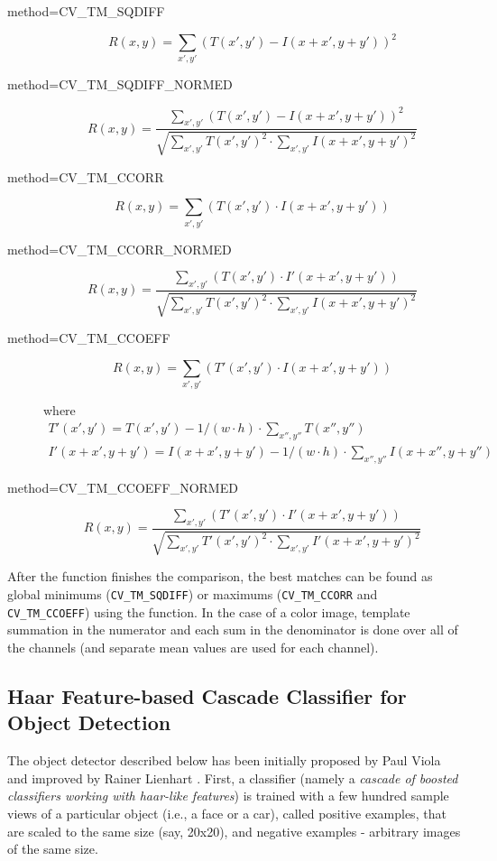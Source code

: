 \begin{description}
\item[method=CV\_TM\_SQDIFF]
\[ R(x,y)=\sum_{x',y'} (T(x',y')-I(x+x',y+y'))^2 \]

\item[method=CV\_TM\_SQDIFF\_NORMED]
\[ R(x,y)=\frac
{\sum_{x',y'} (T(x',y')-I(x+x',y+y'))^2}
{\sqrt{\sum_{x',y'}T(x',y')^2 \cdot \sum_{x',y'} I(x+x',y+y')^2}}
\]

\item[method=CV\_TM\_CCORR]
\[ R(x,y)=\sum_{x',y'} (T(x',y') \cdot I(x+x',y+y')) \]

\item[method=CV\_TM\_CCORR\_NORMED]
\[ R(x,y)=\frac
{\sum_{x',y'} (T(x',y') \cdot I'(x+x',y+y'))}
{\sqrt{\sum_{x',y'}T(x',y')^2 \cdot \sum_{x',y'} I(x+x',y+y')^2}}
\]

\item[method=CV\_TM\_CCOEFF]
\[ R(x,y)=\sum_{x',y'} (T'(x',y') \cdot I(x+x',y+y')) \]

where
\[ 
\begin{array}{l}
T'(x',y')=T(x',y') - 1/(w \cdot h) \cdot \sum_{x'',y''} T(x'',y'')\\
I'(x+x',y+y')=I(x+x',y+y') - 1/(w \cdot h) \cdot \sum_{x'',y''} I(x+x'',y+y'')
\end{array}
\]

\item[method=CV\_TM\_CCOEFF\_NORMED]
\[ R(x,y)=\frac
{ \sum_{x',y'} (T'(x',y') \cdot I'(x+x',y+y')) }
{ \sqrt{\sum_{x',y'}T'(x',y')^2 \cdot \sum_{x',y'} I'(x+x',y+y')^2} }
\]
\end{description}

After the function finishes the comparison, the best matches can be found as global minimums (\texttt{CV\_TM\_SQDIFF}) or maximums (\texttt{CV\_TM\_CCORR} and \texttt{CV\_TM\_CCOEFF}) using the  function. In the case of a color image, template summation in the numerator and each sum in the denominator is done over all of the channels (and separate mean values are used for each channel).

\subsection{Haar Feature-based Cascade Classifier for Object Detection}

The object detector described below has been initially proposed by Paul Viola
and improved by Rainer Lienhart
. First, a classifier (namely a \emph{cascade of boosted classifiers working with haar-like features}) is trained with a few hundred sample views of a particular object (i.e., a face or a car), called positive examples, that are scaled to the same size (say, 20x20), and negative examples - arbitrary images of the same size.

